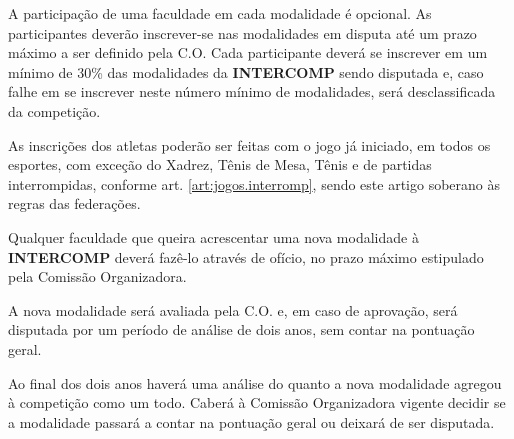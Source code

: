 \begin{article}
	A participação de uma faculdade em cada modalidade é opcional. As participantes deverão inscrever-se nas modalidades em disputa até um prazo máximo a ser definido pela C.O. Cada participante deverá se inscrever em um mínimo de 30\% das modalidades da \textbf{INTERCOMP} sendo disputada e, caso falhe em se inscrever neste número mínimo de modalidades, será desclassificada da competição.
\end{article}

\begin{article}
	As inscrições dos atletas poderão ser feitas com o jogo já iniciado, em todos os esportes, com exceção do Xadrez, Tênis de Mesa, Tênis e de partidas interrompidas, conforme art. \ref{art:jogos.interromp}\ulo, sendo este artigo soberano às regras das federações.
\end{article}

\begin{article}
	Qualquer faculdade que queira acrescentar uma nova modalidade à \textbf{INTERCOMP} deverá fazê-lo através de ofício, no prazo máximo estipulado pela Comissão Organizadora.

	\begin{xparagraph}
		A nova modalidade será avaliada pela C.O. e, em caso de aprovação, será disputada por um período de análise de dois anos, sem contar na pontuação geral.
	\end{xparagraph}

	\begin{xparagraph}
		Ao final dos dois anos haverá uma análise do quanto a nova modalidade agregou à competição como um todo. Caberá à Comissão Organizadora vigente decidir se a modalidade passará a contar na pontuação geral ou deixará de ser disputada.
	\end{xparagraph}
\end{article}
